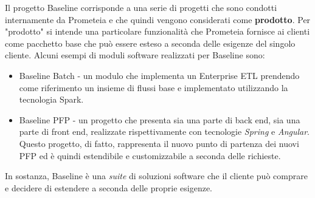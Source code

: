 Il progetto Baseline corrisponde a una serie di progetti che sono condotti internamente da Prometeia e che quindi vengono considerati come \textbf{prodotto}.
Per "prodotto" si intende una particolare funzionalità che Prometeia fornisce ai clienti come pacchetto base che può essere esteso a seconda delle esigenze del singolo cliente.
Alcuni esempi di moduli software realizzati per Baseline sono:
\begin{itemize}
    \item Baseline Batch - un modulo che implementa un Enterprise ETL prendendo come riferimento un insieme di flussi base e implementato utilizzando la tecnologia Spark.
    \item Baseline PFP - un progetto che presenta sia una parte di back end, sia una parte di front end, realizzate rispettivamente con tecnologie \textit{Spring} e \textit{Angular}.
    Questo progetto, di fatto, rappresenta il nuovo punto di partenza dei nuovi PFP ed è quindi estendibile e customizzabile a seconda delle richieste.
\end{itemize}
In sostanza, Baseline è una \textit{suite} di soluzioni software che il cliente può comprare e decidere di estendere a seconda delle proprie esigenze.

